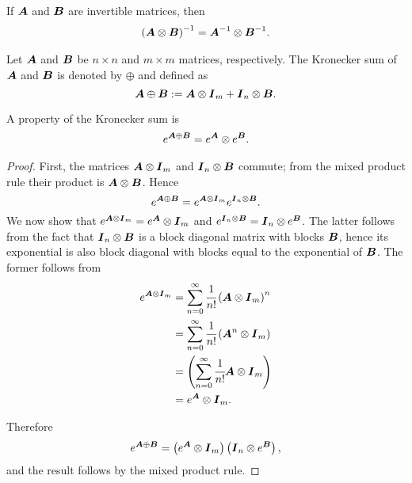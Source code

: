 If \(\boldsymbol A\) and \(\boldsymbol{B}\) are invertible matrices, then 
\begin{align}\label{eqn:kron inverse}
	\left(\boldsymbol A\otimes \boldsymbol{B}\right)^{-1} = \boldsymbol A^{-1}\otimes \boldsymbol{B}^{-1}.
\end{align}

Let \(\boldsymbol A\) and \(\boldsymbol{B}\) be \(n\times n\) and \(m\times m\) matrices, respectively. The Kronecker sum of \(\boldsymbol A\) and \(\boldsymbol{B}\) is denoted by \(\oplus\) and defined as 
\[\boldsymbol A\oplus \boldsymbol{B} := \boldsymbol A\otimes \boldsymbol{I}_{m} + \boldsymbol{I}_{n}\otimes \boldsymbol{B}.\]

A property of the Kronecker sum is 
\begin{align}\label{eqn:kron exp}
	e^{\boldsymbol A\oplus \boldsymbol{B}}= e^{\boldsymbol A}\otimes e^{\boldsymbol{B}}.
\end{align}
\begin{proof}
	First, the matrices \(\boldsymbol A\otimes \boldsymbol{I}_m\) and \(\boldsymbol{I}_n\otimes \boldsymbol{B}\) commute; from the mixed product rule their product is \(\boldsymbol A\otimes \boldsymbol{B}\). Hence 
	\[e^{\boldsymbol A\oplus \boldsymbol{B}} = e^{\boldsymbol A\otimes \boldsymbol{I}_m}e^{\boldsymbol{I}_n\otimes \boldsymbol{B}}.\]
	We now show that \(e^{\boldsymbol A\otimes \boldsymbol{I}_m} = e^{\boldsymbol A}\otimes \boldsymbol{I}_m\) and \(e^{\boldsymbol{I}_n\otimes \boldsymbol{B}}=\boldsymbol{I}_n\otimes e^{\boldsymbol{B}}\). The latter follows from the fact that \(\boldsymbol{I}_n\otimes \boldsymbol{B}\) is a block diagonal matrix with blocks \(\boldsymbol{B}\), hence its exponential is also block diagonal with blocks equal to the exponential of \(\boldsymbol{B}\). The former follows from 
	\begin{align}
	e^{\boldsymbol A\otimes \boldsymbol{I}_m} &= \sum_{n=0}^\infty \cfrac{1}{n!}\left(\boldsymbol A\otimes \boldsymbol{I}_m\right)^n \nonumber
	\\&= \sum_{n=0}^\infty \cfrac{1}{n!}\left(\boldsymbol A^n\otimes \boldsymbol{I}_m\right) \nonumber
	\\&=\left(\sum_{n=0}^\infty \cfrac{1}{n!}\boldsymbol A\otimes \boldsymbol{I}_m\right) \nonumber
	\\&=e^{\boldsymbol A}\otimes \boldsymbol{I}_m.\label{eqn:09ksdjgah}
	\end{align}
	
	Therefore 
	\[e^{\boldsymbol A\oplus \boldsymbol{B}} = \left(e^{\boldsymbol A}\otimes \boldsymbol{I}_m\right)\left(\boldsymbol{I}_n\otimes e^{\boldsymbol{B}}\right),\]
	and the result follows by the mixed product rule. 
\end{proof}

